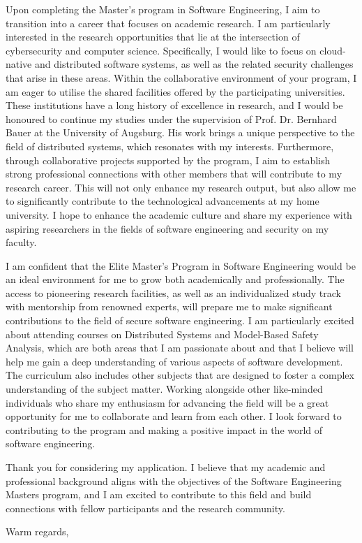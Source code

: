 \documentclass[12pt]{letter}
\begin{document}
\begin{letter}{}
Upon completing the Master's program in Software Engineering, I aim to transition into a career that focuses on academic research. I am particularly interested in the research opportunities that lie at the intersection of cybersecurity and computer science. Specifically, I would like to focus on cloud-native and distributed software systems, as well as the related security challenges that arise in these areas. Within the collaborative environment of your program, I am eager to utilise the shared facilities offered by the participating universities. These institutions have a long history of excellence in research, and I would be honoured to continue my studies under the supervision of Prof. Dr. Bernhard Bauer at the University of Augsburg. His work brings a unique perspective to the field of distributed systems, which resonates with my interests.
Furthermore, through collaborative projects supported by the program, I aim to establish strong professional connections with other members that will contribute to my research career. This will not only enhance my research output, but also allow me to significantly contribute to the technological advancements at my home university. I hope to enhance the academic culture and share my experience with aspiring researchers in the fields of software engineering and security on my faculty.

I am confident that the Elite Master's Program in Software Engineering would be an ideal environment for me to grow both academically and professionally. The access to pioneering research facilities, as well as an individualized study track with mentorship from renowned experts, will prepare me to make significant contributions to the field of secure software engineering. I am particularly excited about attending courses on Distributed Systems and Model-Based Safety Analysis, which are both areas that I am passionate about and that I believe will help me gain a deep understanding of various aspects of software development. The curriculum also includes other subjects that are designed to foster a complex understanding of the subject matter. Working alongside other like-minded individuals who share my enthusiasm for advancing the field will be a great opportunity for me to collaborate and learn from each other. I look forward to contributing to the program and making a positive impact in the world of software engineering.

Thank you for considering my application. I believe that my academic and professional background aligns with the objectives of the Software Engineering Masters program, and I am excited to contribute to this field and build connections with fellow participants and the research community.


\closing{Warm regards,}


\end{letter}
\end{document}
